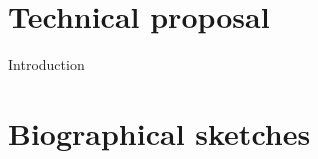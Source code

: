 \documentclass[isdraft, iswhitepaper, issectioncompact, isbibcompact]{grant-aro}
\begin{document}
\makeabstractcoverpage

\chapter{Technical proposal}

Introduction

\printbibliography[heading=none]

\chapter{Biographical sketches}
\end{document}
